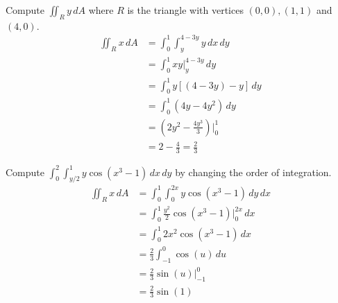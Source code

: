 \documentclass[handout]{ximera}
\begin{document}
\begin{example}[Example 5]
Compute $\iint_R y \, dA$ where $R$ is the triangle with vertices $(0,0), (1,1)$ and $(4,0)$.\\

\begin{align*}
\iint_R x \, dA & = \int_0^1 \int_{y}^{4-3y} y \, dx \, dy\\
                 & = \int_0^1   xy \bigg|_{y}^{4-3y} \, dy\\
                 & = \int_0^1   y\left[(4-3y) -y\right] \, dy\\
                 &= \int_0^1 \left(4y - 4y^2\right) \, dy\\
                 &= \left(2y^2 - \frac{4y^3}{3}\right) \bigg|_0^1\\
                 &= 2- \frac43 = \frac23
\end{align*} 

\end{example}



\begin{example}[Example 6]
Compute $\int_0^2 \int_{y/2}^1 y\cos(x^3 -1) \,dx \, dy$ by changing the order of integration.\\

\begin{align*}
\iint_R x \, dA & = \int_0^1 \int_0^{2x} y \cos(x^3-1) \, dy \, dx\\
                 & = \int_0^1  \frac{y^2}{2} \cos (x^3 - 1) \bigg|_0^{2x} \, dx\\
                 & = \int_0^1  2x^2 \cos(x^3 -1) \, dx\\
                 &= \frac23 \int_{-1}^0 \cos(u) \, du\\
                 &= \frac23 \sin(u) \bigg|_{-1}^0\\
                 &= \frac{2}{3}\sin(1)
\end{align*}  

\end{example}
\end{document}
